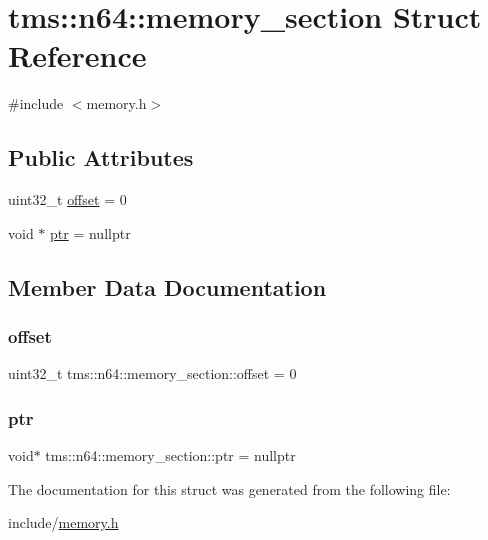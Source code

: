 \hypertarget{structtms_1_1n64_1_1memory__section}{}\section{tms\+:\+:n64\+:\+:memory\+\_\+section Struct Reference}
\label{structtms_1_1n64_1_1memory__section}


{\ttfamily \#include $<$memory.\+h$>$}

\subsection*{Public Attributes}
\begin{DoxyCompactItemize}
\item 
uint32\+\_\+t \hyperlink{structtms_1_1n64_1_1memory__section_aa5753c086648ae1953c44558780ff1b2}{offset} = 0
\item 
void $\ast$ \hyperlink{structtms_1_1n64_1_1memory__section_a6805750330c51d23daa3a7f405531d13}{ptr} = nullptr
\end{DoxyCompactItemize}


\subsection{Member Data Documentation}
\mbox{\label{structtms_1_1n64_1_1memory__section_aa5753c086648ae1953c44558780ff1b2}} 
\subsubsection{\texorpdfstring{offset}{offset}}
{\footnotesize\ttfamily uint32\+\_\+t tms\+::n64\+::memory\+\_\+section\+::offset = 0}

\mbox{\label{structtms_1_1n64_1_1memory__section_a6805750330c51d23daa3a7f405531d13}} 
\subsubsection{\texorpdfstring{ptr}{ptr}}
{\footnotesize\ttfamily void$\ast$ tms\+::n64\+::memory\+\_\+section\+::ptr = nullptr}



The documentation for this struct was generated from the following file\+:\begin{DoxyCompactItemize}
\item 
include/\hyperlink{memory_8h}{memory.\+h}\end{DoxyCompactItemize}
